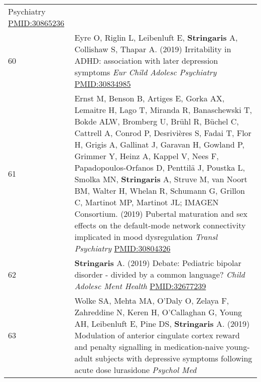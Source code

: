 \documentclass[
]{article}
\begin{document}
\begin{longtable}[]{@{}ll@{}}
\begin{minipage}[t]{0.94\columnwidth}
{Psychiatry} \url{PMID:30865236}\strut
\end{minipage}\tabularnewline
\begin{minipage}[t]{0.01\columnwidth}\raggedright
60\strut
\end{minipage} & \begin{minipage}[t]{0.94\columnwidth}\raggedright
Eyre O, Riglin L, Leibenluft E, \textbf{Stringaris} A, Collishaw S,
Thapar A. (2019) Irritability in ADHD: association with later depression
symptoms \emph{Eur Child Adolesc Psychiatry} \url{PMID:30834985}\strut
\end{minipage}\tabularnewline
\begin{minipage}[t]{0.01\columnwidth}\raggedright
61\strut
\end{minipage} & \begin{minipage}[t]{0.94\columnwidth}\raggedright
Ernst M, Benson B, Artiges E, Gorka AX, Lemaitre H, Lago T, Miranda R,
Banaschewski T, Bokde ALW, Bromberg U, Brühl R, Büchel C, Cattrell A,
Conrod P, Desrivières S, Fadai T, Flor H, Grigis A, Gallinat J, Garavan
H, Gowland P, Grimmer Y, Heinz A, Kappel V, Nees F, Papadopoulos-Orfanos
D, Penttilä J, Poustka L, Smolka MN, \textbf{Stringaris} A, Struve M,
van Noort BM, Walter H, Whelan R, Schumann G, Grillon C, Martinot MP,
Martinot JL; IMAGEN Consortium. (2019) Pubertal maturation and sex
effects on the default-mode network connectivity implicated in mood
dysregulation \emph{Transl Psychiatry} \url{PMID:30804326}\strut
\end{minipage}\tabularnewline
\begin{minipage}[t]{0.01\columnwidth}\raggedright
62\strut
\end{minipage} & \begin{minipage}[t]{0.94\columnwidth}\raggedright
\textbf{Stringaris} A. (2019) Debate: Pediatric bipolar disorder -
divided by a common language? \emph{Child Adolesc Ment Health}
\url{PMID:32677239}\strut
\end{minipage}\tabularnewline
\begin{minipage}[t]{0.01\columnwidth}\raggedright
63\strut
\end{minipage} & \begin{minipage}[t]{0.94\columnwidth}\raggedright
Wolke SA, Mehta MA, O'Daly O, Zelaya F, Zahreddine N, Keren H,
O'Callaghan G, Young AH, Leibenluft E, Pine DS, \textbf{Stringaris} A.
(2019) Modulation of anterior cingulate cortex reward and penalty
signalling in medication-naive young-adult subjects with depressive
symptoms following acute dose lurasidone \emph{Psychol Med}

\end{minipage}
\end{longtable}
\end{document}
